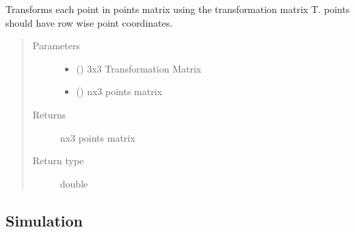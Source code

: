 \documentclass[letterpaper,10pt,english]{sphinxmanual}
\begin{document}

\begin{fulllineitems}
\label{\detokenize{api:beamon.core.transform}}
Transforms each point in points matrix using the transformation matrix T.
points should have row wise point coordinates.
\begin{quote}\begin{description}
\item[{Parameters}] \leavevmode\begin{itemize}
\item {} 
 (\sphinxstyleliteralemphasis{\sphinxupquote{{[}}}\sphinxstyleliteralemphasis{\sphinxupquote{{]}}}\sphinxstyleliteralemphasis{\sphinxupquote{{[}}}\sphinxstyleliteralemphasis{\sphinxupquote{{]}}}) \textendash{} 3x3 Transformation Matrix

\item {} 
 (\sphinxstyleliteralemphasis{\sphinxupquote{{[}}}\sphinxstyleliteralemphasis{\sphinxupquote{{]}}}\sphinxstyleliteralemphasis{\sphinxupquote{{[}}}\sphinxstyleliteralemphasis{\sphinxupquote{{]}}}) \textendash{} nx3 points matrix

\end{itemize}

\item[{Returns}] \leavevmode
nx3 points matrix

\item[{Return type}] \leavevmode
double

\end{description}\end{quote}

\end{fulllineitems}



\subsection{Simulation}
\label{\detokenize{api:module-beamon.simulation}}\label{\detokenize{api:simulation}}
\end{document}
